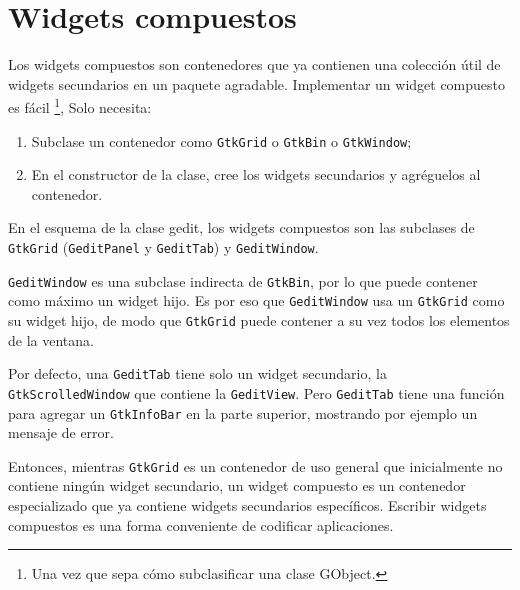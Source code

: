 \section{Widgets compuestos}

Los widgets compuestos son contenedores que ya contienen una colección útil de widgets secundarios en un paquete agradable. Implementar un widget compuesto es fácil \footnote{Una vez que sepa cómo subclasificar una clase GObject.}, Solo necesita:
\begin{enumerate}
  \item Subclase un contenedor como \lstinline{GtkGrid} o \lstinline{GtkBin} o \lstinline{GtkWindow};
  \item En el constructor de la clase, cree los widgets secundarios y agréguelos al contenedor.
\end{enumerate}

En el esquema de la clase gedit, los widgets compuestos son las subclases de \lstinline{GtkGrid} (\lstinline{GeditPanel} y \lstinline{GeditTab}) y \lstinline{GeditWindow}.

\lstinline{GeditWindow} es una subclase indirecta de \lstinline{GtkBin}, por lo que puede contener como máximo un widget hijo. Es por eso que \lstinline{GeditWindow} usa un \lstinline{GtkGrid} como su widget hijo, de modo que \lstinline{GtkGrid} puede contener a su vez todos los elementos de la ventana.

Por defecto, una \lstinline{GeditTab} tiene solo un widget secundario, la \lstinline{GtkScrolledWindow} que contiene la \lstinline{GeditView}. Pero \lstinline{GeditTab} tiene una función para agregar un \lstinline{GtkInfoBar} en la parte superior, mostrando por ejemplo un mensaje de error.

Entonces, mientras \lstinline{GtkGrid} es un contenedor de uso general que inicialmente no contiene ningún widget secundario, un widget compuesto es un contenedor especializado que ya contiene widgets secundarios específicos. Escribir widgets compuestos es una forma conveniente de codificar aplicaciones.

